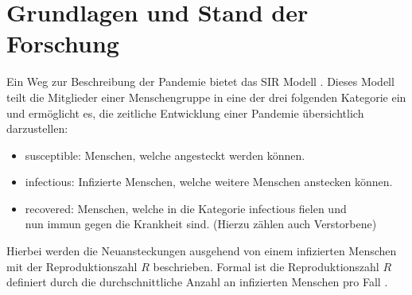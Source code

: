 \chapter{Grundlagen und Stand der Forschung}\label{chap:Grundlagen und Stand der Forschung}
Ein Weg zur Beschreibung der Pandemie bietet das SIR Modell \autocite{SIR}. Dieses Modell teilt die Mitglieder einer Menschengruppe in eine der drei folgenden Kategorie ein und ermöglicht es, die zeitliche Entwicklung einer Pandemie übersichtlich darzustellen:
\begin{itemize}
    \item \glqq{}susceptible\grqq{}: Menschen, welche angesteckt werden können.
    \item \glqq{}infectious\grqq{}: Infizierte Menschen, welche weitere Menschen anstecken können.
    \item \glqq{}recovered\grqq{}: Menschen, welche in die Kategorie \glqq{}infectious\grqq{} fielen und\\
    nun immun gegen die Krankheit sind. (Hierzu zählen auch Verstorbene)
\end{itemize}
Hierbei werden die Neuansteckungen ausgehend von einem infizierten Menschen mit der Reproduktionszahl $R$ beschrieben. Formal ist die Reproduktionszahl $R$ definiert durch die durchschnittliche Anzahl an infizierten Menschen pro Fall \autocite{ReZahl}.
